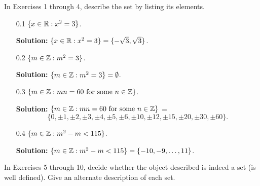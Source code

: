 In Exercises 1 through 4, describe the set by listing its elements.
\begin{enumerate}
   \item[0.1] $\{x \in \mathbb{R} : x^2 = 3\}$.

      \textbf{Solution:} $\{x \in \mathbb{R} : x^2 = 3\} = \{-\sqrt{3}, \sqrt{3}\}$.
   \item[0.2] $\{m \in \mathbb{Z} : m^2 = 3\}$.

      \textbf{Solution:} $\{m \in \mathbb{Z} : m^2 = 3\} = \emptyset$.
   \item[0.3] $\{m \in \mathbb{Z} : mn = 60 \mbox{ for some } n \in \mathbb{Z}\}$.

      \textbf{Solution:} $\{m \in \mathbb{Z} : mn = 60 \mbox{ for some } n \in \mathbb{Z}\}$ = 
      $$\{0, \pm1, \pm2, \pm3, \pm4, \pm5, \pm6,
          \pm10, \pm12, \pm15, \pm20, \pm30, \pm60\}.$$
   \item[0.4] $\{m \in \mathbb{Z} : m^2 - m < 115\}$.

      \textbf{Solution:} $\{m \in \mathbb{Z} : m^2 - m < 115\} =
      \{-10, -9, \ldots, 11\}$.
\end{enumerate}

\noindent In Exercises 5 through 10, decide whether the object described is 
indeed a set (is well defined). Give an alternate description of each set.
 
